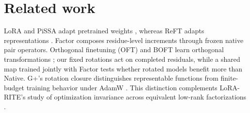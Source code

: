 \section{Related work}
LoRA and PiSSA adapt pretrained weights \citep{hu2021lora,meng2024pissa},
whereas ReFT adapts representations \citep{wu2024reft}. Factor composes
residue-level increments through frozen native pair operators. Orthogonal
finetuning (OFT) and BOFT learn orthogonal transformations
\citep{qiu2023oft,liu2023boft}; our fixed rotations act on completed
residuals, while a shared map trained jointly with Factor tests whether
rotated models benefit more than Native.
G+'s rotation closure distinguishes representable functions from
finite-budget training behavior under AdamW \citep{loshchilov2019adamw}.
This distinction complements LoRA-RITE's study of optimization invariance
across equivalent low-rank factorizations \citep{yen2025lorarite}.
